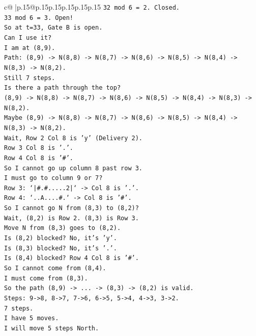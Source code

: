\documentclass{article}
\begin{document}
{\begin{supertabular}{c@{$\;$}|p{.15\linewidth}@{}p{.15\linewidth}p{.15\linewidth}p{.15\linewidth}p{.15\linewidth}p{.15\linewidth}}
{{{\texttt{32 mod 6 = 2. Closed.} \\
\texttt{33 mod 6 = 3. Open!} \\
\texttt{So at t=33, Gate B is open.} \\
\texttt{Can I use it?} \\
\texttt{I am at (8,9).} \\
\texttt{Path: (8,9) {-}> N(8,8) {-}> N(8,7) {-}> N(8,6) {-}> N(8,5) {-}> N(8,4) {-}> N(8,3) {-}> N(8,2).} \\
\texttt{Still 7 steps.} \\
\texttt{Is there a path through the top?} \\
\texttt{(8,9) {-}> N(8,8) {-}> N(8,7) {-}> N(8,6) {-}> N(8,5) {-}> N(8,4) {-}> N(8,3) {-}> N(8,2).} \\
\texttt{Maybe (8,9) {-}> N(8,8) {-}> N(8,7) {-}> N(8,6) {-}> N(8,5) {-}> N(8,4) {-}> N(8,3) {-}> N(8,2).} \\
\texttt{Wait, Row 2 Col 8 is 'y' (Delivery 2).} \\
\texttt{Row 3 Col 8 is '.'.} \\
\texttt{Row 4 Col 8 is '\#'.} \\
\texttt{So I cannot go up column 8 past row 3.} \\
\texttt{I must go to column 9 or 7?} \\
\texttt{Row 3: `|\#.\#.....2|` {-}> Col 8 is '.'.} \\
\texttt{Row 4: `..A....\#.` {-}> Col 8 is '\#'.} \\
\texttt{So I cannot go N from (8,3) to (8,2)?} \\
\texttt{Wait, (8,2) is Row 2. (8,3) is Row 3.} \\
\texttt{Move N from (8,3) goes to (8,2).} \\
\texttt{Is (8,2) blocked? No, it's 'y'.} \\
\texttt{Is (8,3) blocked? No, it's '.'.} \\
\texttt{Is (8,4) blocked? Row 4 Col 8 is '\#'.} \\
\texttt{So I cannot come from (8,4).} \\
\texttt{I must come from (8,3).} \\
\texttt{So the path (8,9) {-}> ... {-}> (8,3) {-}> (8,2) is valid.} \\
\texttt{Steps: 9{-}>8, 8{-}>7, 7{-}>6, 6{-}>5, 5{-}>4, 4{-}>3, 3{-}>2.} \\
\texttt{7 steps.} \\
\texttt{I have 5 moves.} \\
\texttt{I will move 5 steps North.} \\
}}}
\end{supertabular}}
\end{document}

